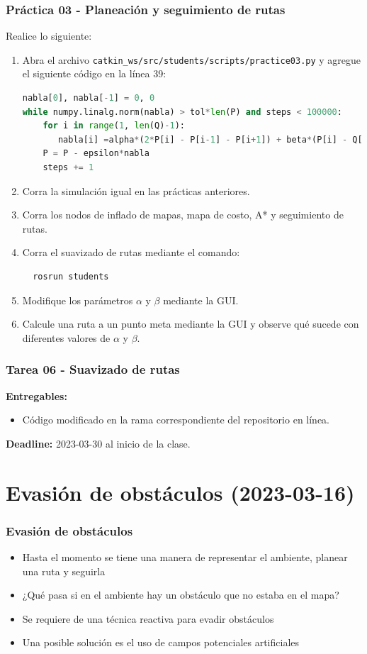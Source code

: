 \begin{frame}[containsverbatim]\frametitle{Práctica 03 - Planeación y seguimiento de rutas}
  Realice lo siguiente:
  \begin{enumerate}
     \item Abra el archivo \texttt{catkin\_ws/src/students/scripts/practice03.py} y agregue el siguiente código en la línea 39:
  \begin{lstlisting}[language=Python,firstnumber=39]
nabla[0], nabla[-1] = 0, 0
while numpy.linalg.norm(nabla) > tol*len(P) and steps < 100000:
    for i in range(1, len(Q)-1):
       nabla[i] =alpha*(2*P[i] - P[i-1] - P[i+1]) + beta*(P[i] - Q[i])
    P = P - epsilon*nabla
    steps += 1
  \end{lstlisting}
  \item Corra la simulación igual en las prácticas anteriores. 
  \item Corra los nodos de inflado de mapas, mapa de costo, A* y seguimiento de rutas.
  \item Corra el suavizado de rutas mediante el comando:
    \begin{verbatim}
  rosrun students 
\end{verbatim}
  \item Modifique los parámetros $\alpha$ y $\beta$ mediante la GUI.
  \item Calcule una ruta a un punto meta mediante la GUI y observe qué sucede con diferentes valores de $\alpha$ y $\beta$. 
  \end{enumerate}
\end{frame}


\begin{frame}[containsverbatim]\frametitle{Tarea 06 - Suavizado de rutas}
 \textbf{Entregables:}
  \begin{itemize}
  \item Código modificado en la rama correspondiente del repositorio en línea.
  \end{itemize}
  \textbf{Deadline: } 2023-03-30 al inicio de la clase. 
\end{frame}


\section{Evasión de obstáculos (2023-03-16)}
\begin{frame}\frametitle{Evasión de obstáculos}
  \begin{itemize}
  \item Hasta el momento se tiene una manera de representar el ambiente, planear una ruta y seguirla
  \item ¿Qué pasa si en el ambiente hay un obstáculo que no estaba en el mapa?
  \item Se requiere de una técnica reactiva para evadir obstáculos
  \item Una posible solución es el uso de campos potenciales artificiales
  \end{itemize}
\end{frame}

